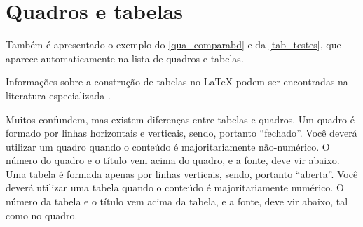 \begin{apendicesenv}
\begin{figure}[!b]
{        }\hspace{2ex} %
        \label{fig_figura_exemplo2}
    \end{figure}

    \section{Quadros e tabelas}
    \label{sec_tabelas}

    Também é apresentado o exemplo do \autoref{qua_comparabd} e da \autoref{tab_testes}, que aparece automaticamente na lista de quadros e tabelas.

    Informações sobre a construção de tabelas no \LaTeX{} podem ser encontradas na literatura especializada \cite{Lamport1986,Buerger1989,Kopka2003,Mittelbach2004}.

    

    Muitos confundem, mas existem diferenças entre  tabelas e  quadros.
    Um quadro é formado por linhas horizontais e verticais, sendo, portanto ``fechado''.
    Você deverá utilizar um quadro quando o conteúdo é majoritariamente não-numérico.
    O número do quadro e o título vem acima do quadro, e a fonte, deve vir abaixo.
    Uma tabela é formada apenas por linhas verticais, sendo, portanto ``aberta''.
    Você deverá utilizar uma tabela quando o conteúdo é majoritariamente numérico.
    O número da tabela e o título vem acima da tabela, e a fonte, deve vir abaixo, tal como no quadro.


\end{apendicesenv}
